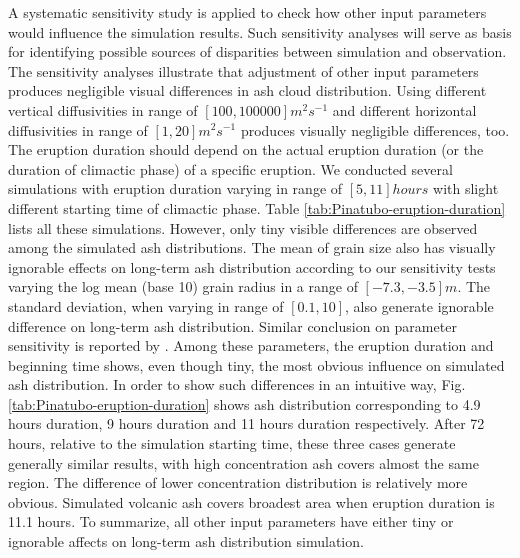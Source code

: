A systematic sensitivity study is applied to check how other input parameters would influence the simulation results. Such sensitivity analyses will serve as basis for identifying possible sources of disparities between simulation and observation.
The sensitivity analyses illustrate that adjustment of other input parameters produces negligible visual differences in ash cloud distribution. Using different vertical diffusivities in range of $[100, 100000] m^2s^{-1} $ and different horizontal diffusivities in range of $[1, 20] m^2s^{-1}$ produces visually negligible differences, too. 
The eruption duration should depend on the actual eruption duration (or the duration of climactic phase) of a specific eruption. We conducted several simulations with eruption duration varying in range of $[5, 11] hours$ with slight different starting time of climactic phase. Table \ref{tab:Pinatubo-eruption-duration} lists all these simulations. However, only tiny visible differences are observed among the simulated ash distributions. The mean of grain size also has visually ignorable effects on long-term ash distribution according to our sensitivity tests varying the log mean (base 10) grain radius in a range of $[-7.3, -3.5] m$. 
The standard deviation, when varying in range of $[0.1, 10]$, also generate ignorable difference on long-term ash distribution. Similar conclusion on parameter sensitivity is reported by \citet{fero2008simulation}.
Among these parameters, the eruption duration and beginning time shows, even though tiny, the most obvious influence on simulated ash distribution. In order to show such differences in an intuitive way, Fig. \ref{tab:Pinatubo-eruption-duration} shows ash distribution corresponding to 4.9 hours duration, 9 hours duration and 11 hours duration respectively. After 72 hours, relative to the simulation starting time, these three cases generate generally similar results, with high concentration ash covers almost the same region. The difference of lower concentration distribution is relatively more obvious. Simulated volcanic ash covers broadest area when eruption duration is 11.1 hours. To summarize, all other input parameters have either tiny or ignorable affects on long-term ash distribution simulation. 

